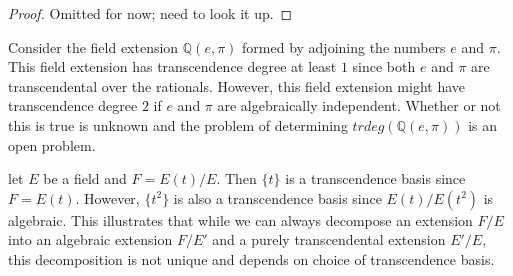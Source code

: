 \begin{proof} Omitted for now; need to look it up.
\end{proof}
\begin{example} Consider the field extension $\mathbb{Q}(e,\pi)$ formed by adjoining the numbers $e$ and $\pi$. This field extension has transcendence degree at least $1$ since both $e$ and $\pi$ are transcendental over the rationals. However, this field extension might have transcendence degree $2$ if $e$ and $\pi$ are algebraically independent. Whether or not this is true is unknown and the problem of determining $trdeg(\mathbb{Q}(e,\pi))$ is an open problem.\end{example}
\begin{example} let $E$ be a field and $F=E(t)/E$. Then $\{t\}$ is a transcendence basis since $F=E(t)$. However, $\{t^2\}$ is also a transcendence basis since $E(t)/E(t^2)$ is algebraic. This illustrates that while we can always decompose an extension $F/E$ into an algebraic extension $F/E'$ and a purely transcendental extension $E'/E$, this decomposition is not unique and depends on choice of transcendence basis. \end{example}


